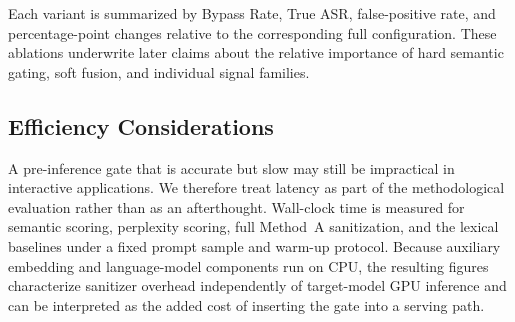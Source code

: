 Each variant is summarized by Bypass Rate, True ASR, false-positive rate, and percentage-point changes relative to the corresponding full configuration.
These ablations underwrite later claims about the relative importance of hard semantic gating, soft fusion, and individual signal families.

\subsection{Efficiency Considerations}
\label{sec:runtime}

A pre-inference gate that is accurate but slow may still be impractical in interactive applications.
We therefore treat latency as part of the methodological evaluation rather than as an afterthought.
Wall-clock time is measured for semantic scoring, perplexity scoring, full Method~A sanitization, and the lexical baselines under a fixed prompt sample and warm-up protocol.
Because auxiliary embedding and language-model components run on CPU, the resulting figures characterize sanitizer overhead independently of target-model GPU inference and can be interpreted as the added cost of inserting the gate into a serving path.
